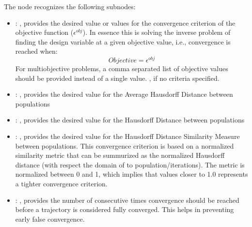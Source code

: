 \begin{itemize}
      The  node recognizes the following subnodes:
      \begin{itemize}
        \item {}: ,
          provides the desired value or values for the convergence criterion of the objective
          function                        ($\epsilon^{obj}$). In essence this is solving the inverse
          problem of finding the design variable                         at a given objective value,
          i.e., convergence is reached when: $$ Objective = \epsilon^{obj}$$
          For multiobjective problems, a comma separated list of objective
          values should be provided instead of a single value.
          , if no criteria specified.

        \item {}: ,
          provides the desired value for the Average Hausdorff Distance between populations

        \item {}: ,
          provides the desired value for the Hausdorff Distance between populations

        \item {}: ,
          provides the desired value for the Hausdorff Distance Similarity Measure between
          populations.                                     This convergence criterion is based on a
          normalized                                     similarity metric that can be summurized as
          the normalized Hausdorff distance                                     (with respect the
          domain of to population/iterations). The metric is normalized between 0 and 1,
          which implies that values closer to 1.0 represents a tighter convergence criterion.

        \item {}: ,
          provides the number of consecutive times convergence should be reached before a trajectory
          is considered fully converged. This helps in preventing early false convergence.
      \end{itemize}


\end{itemize}
